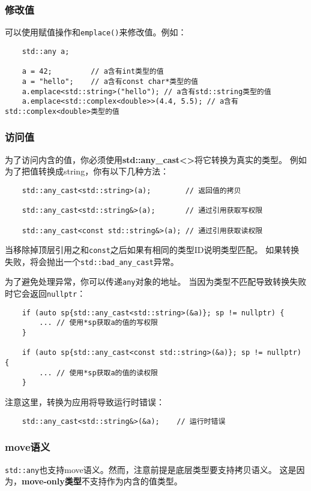 \subsubsection{修改值}
可以使用赋值操作和\texttt{emplace()}来修改值。例如：
\begin{lstlisting}
    std::any a;

    a = 42;         // a含有int类型的值
    a = "hello";    // a含有const char*类型的值
    a.emplace<std::string>("hello"); // a含有std::string类型的值
    a.emplace<std::complex<double>>(4.4, 5.5); // a含有std::complex<double>类型的值
\end{lstlisting}

\subsubsection{访问值}
为了访问内含的值，你必须使用\textbf{std::any\_cast<>}将它转换为真实的类型。
例如为了把值转换成string，你有以下几种方法：
\begin{lstlisting}
    std::any_cast<std::string>(a);        // 返回值的拷贝

    std::any_cast<std::string&>(a);       // 通过引用获取写权限

    std::any_cast<const std::string&>(a); // 通过引用获取读权限
\end{lstlisting}
当移除掉顶层引用之和\texttt{const}之后如果有相同的类型ID说明类型匹配。
如果转换失败，将会抛出一个\texttt{std::bad\_any\_cast}异常。

为了避免处理异常，你可以传递\texttt{any}对象的地址。
当因为类型不匹配导致转换失败时它会返回\texttt{nullptr}：
\begin{lstlisting}
    if (auto sp{std::any_cast<std::string>(&a)}; sp != nullptr) {
        ... // 使用*sp获取a的值的写权限
    }

    if (auto sp{std::any_cast<const std::string>(&a)}; sp != nullptr) {
        ... // 使用*sp获取a的值的读权限
    }
\end{lstlisting}
注意这里，转换为应用将导致运行时错误：
\begin{lstlisting}
    std::any_cast<std::string&>(&a);    // 运行时错误
\end{lstlisting}

\subsubsection{move语义}
\texttt{std::any}也支持move语义。然而，注意前提是底层类型要支持拷贝语义。
这是因为，\textbf{move-only类型}不支持作为内含的值类型。

